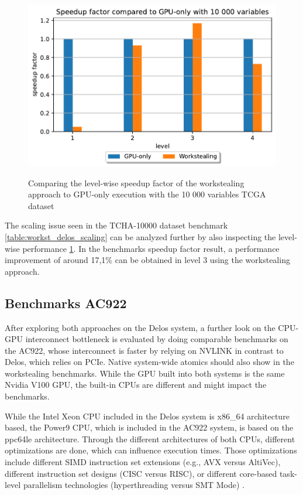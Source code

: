 \begin{figure}[H]
  \caption{Comparing the level-wise speedup factor of the workstealing approach to GPU-only execution with the 10 000 variables TCGA dataset}
  \includegraphics[width=\textwidth]{figures/levelwise_scaled.pdf}
  \centering
  \label{fig:levelwise_scaled_delos}
\end{figure}


The scaling issue seen in the TCHA-10000 dataset benchmark \ref{table:workst_delos_scaling} can be analyzed further by also inspecting the level-wise performance \ref{fig:levelwise_scaled_delos}. In the benchmarks speedup factor result, a performance improvement of around 17,1\% can be obtained in level 3 using the workstealing approach.

\subsection{Benchmarks AC922}
After exploring both approaches on the Delos system, a further look on the CPU-GPU interconnect bottleneck is evaluated by doing comparable benchmarks on the AC922, whose interconnect is faster by relying on NVLINK in contrast to Delos, which relies on PCIe. Native system-wide atomics should also show in the workstealing benchmarks.
While the GPU built into both systems is the same Nvidia V100 GPU, the built-in CPUs are different and might impact the benchmarks.

While the Intel Xeon CPU included in the Delos system is x86\_64 architecture based, the Power9 CPU, which is included in the AC922 system, is based on the ppc64le architecture. Through the different architectures of both CPUs, different optimizations are done, which can influence execution times. Those optimizations include different SIMD instruction set extensions (e.g., AVX versus AltiVec), different instruction set designs (CISC versus RISC), or different core-based task-level parallelism technologies (hyperthreading versus SMT Mode) \cite{AnalysisX86Vs}.

